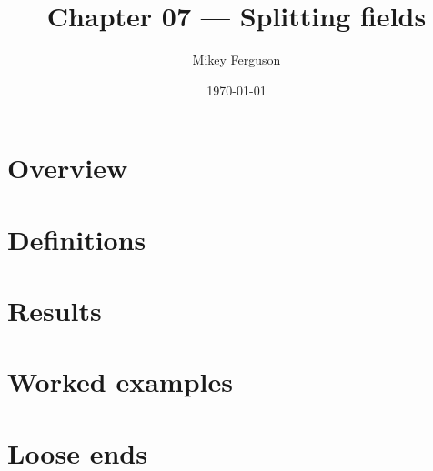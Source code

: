\documentclass[11pt]{article}
\title{Chapter 07 --- Splitting fields}
\author{Mikey Ferguson}
\date{\today}
\begin{document}
\maketitle
\tableofcontents
\bigskip

\section{Overview}

\section{Definitions}

\section{Results}

\section{Worked examples}

\section{Loose ends}
\end{document}
